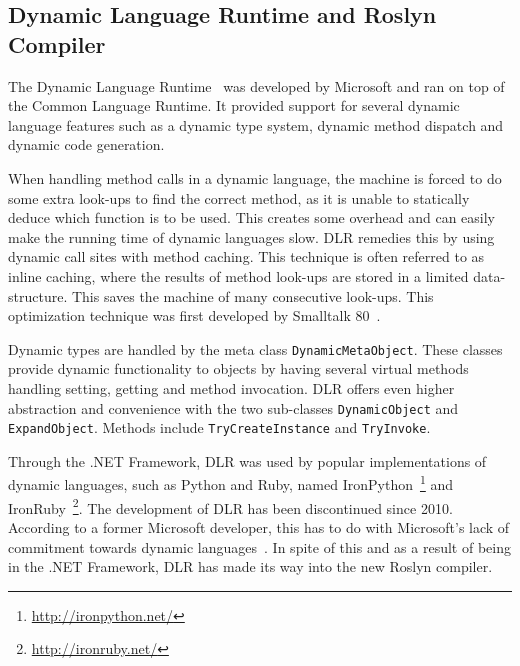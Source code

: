 
\subsection{Dynamic Language Runtime and Roslyn Compiler}

The Dynamic Language Runtime~\cite{dlr} was developed by Microsoft and ran on
top of the Common Language Runtime. It provided support for several dynamic
language features such as a dynamic type system, dynamic method dispatch and
dynamic code generation.

When handling method calls in a dynamic language, the machine is forced to do
some extra look-ups to find the correct method, as it is unable to statically
deduce which function is to be used. This creates some overhead and can easily
make the running time of dynamic languages slow. DLR remedies this by using
dynamic call sites with method caching. This technique is often referred to as
inline caching, where the results of method look-ups are stored in a limited
data-structure. This saves the machine of many consecutive look-ups. This
optimization technique was first developed by Smalltalk 80~\cite{deutsch}.

Dynamic types are handled by the meta class {\tt DynamicMetaObject}. These
classes provide dynamic functionality to objects by having several virtual
methods handling setting, getting and method invocation. DLR offers even higher
abstraction and convenience with the two sub-classes {\tt DynamicObject} and
{\tt ExpandObject}. Methods include {\tt TryCreateInstance} and {\tt TryInvoke}.

Through the .NET Framework, DLR was used by popular implementations of dynamic
languages, such as Python and Ruby, named
IronPython~\footnote{\url{http://ironpython.net/}} and
IronRuby~\footnote{\url{http://ironruby.net/}}. The development of DLR has been
discontinued since 2010. According to a former Microsoft developer, this has to
do with Microsoft's lack of commitment towards dynamic
languages~\cite{schementi}\cite{cooper}. In spite of this and as a result of
being in the .NET Framework, DLR has made its way into the new Roslyn compiler.

